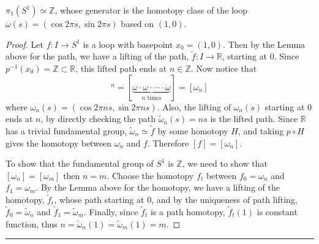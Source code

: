 \begin{thm} $\pi_1(S^1)\simeq \mathbb{Z}$, whose generator is the homotopy class of the loop $\omega(s)=(\cos 2\pi s,\sin 2\pi s)$ based on $(1,0)$.
\end{thm}
\begin{proof}
Let $f:I\rightarrow S^1$ is a loop with basepoint $x_0=(1,0)$. Then by the Lemma above for the path, we have a lifting of the path, $\tilde{f}:I\rightarrow \mathbb{R}$, starting at $0$. Since $p^{-1}(x_0)=\mathbb{Z}\subset \mathbb{R}$, this lifted path ends at $n\in \mathbb{Z}$. Now notice that
\begin{equation}
[\omega]^n=[\underbrace{\omega\cdot\omega\cdot\cdots\cdot\omega}_{n\textrm{ times}}]=[\omega_n]
\end{equation}
where $\omega_n(s)=(\cos 2\pi ns, \sin 2\pi ns)$. Also, the lifting of $\omega_n(s)$ starting at $0$ ends at $n$, by directly checking the path $\tilde{\omega}_n(s)=ns$ is the lifted path. Since $\mathbb{R}$ has a trivial fundamental group, $\tilde{\omega}_n\simeq \tilde{f}$ by some homotopy $H$, and taking $p\circ H$ gives the homotopy between $\omega_n$ and $f$. Therefore $[f]=[\omega_n]$.

To show that the fundamental group of $S^1$ is $\mathbb{Z}$, we need to show that $[\omega_n]=[\omega_m]$ then $n=m$. Choose the homotopy $f_t$ between $f_0=\omega_n$ and $f_1=\omega_m$. By the Lemma above for the homotopy, we have a lifting of the homotopy, $\tilde{f}_t$, whose path starting at $0$, and by the uniqueness of path lifting, $\tilde{f}_0=\tilde{\omega}_n$ and $\tilde{f}_1=\tilde{\omega}_m$. Finally, since $\tilde{f}_t$ is a path homotopy, $\tilde{f}_t(1)$ is constant function, thus $n=\tilde{\omega}_n(1)=\tilde{\omega}_m(1)=m$.
\end{proof}
\noindent\rule{\textwidth}{1pt}
\newline